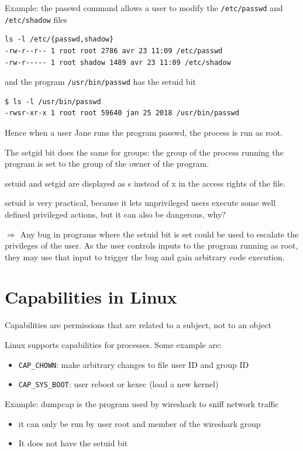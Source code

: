 \documentclass[11pt]{article}
\begin{document}
Example: the passwd command allows a user to modify the \verb|/etc/passwd| and \verb|/etc/shadow| files

\begin{lstlisting}[style=terminal]
ls -l /etc/{passwd,shadow}
-rw-r--r-- 1 root root 2786 avr 23 11:09 /etc/passwd
-rw-r----- 1 root shadow 1489 avr 23 11:09 /etc/shadow
\end{lstlisting}

and the program \verb|/usr/bin/passwd| has the setuid bit
\begin{lstlisting}[style=terminal]
$ ls -l /usr/bin/passwd
-rwsr-xr-x 1 root root 59640 jan 25 2018 /usr/bin/passwd
\end{lstlisting}

Hence when a user Jane runs the program passwd, the process is run as root. 

The setgid bit does the same for groups: the group of the process running the program is set to the group of the owner of the program. 

setuid and setgid are displayed as s instead of x in the access rights of the file.

setuid is very practical, because it lets unprivileged users execute some well defined privileged actions, but it can also be dangerous, why?

$\Rightarrow$ Any bug in programs where the setuid bit is set could be used to escalate the privileges of the user. As the user controls inputs to the program running as root, they may use that input to trigger the bug and gain arbitrary code execution.

\section*{Capabilities in Linux}

Capabilities are permissions that are related to a subject, not to an object

Linux supports capabilities for processes. Some example are: 
\begin{itemize}
	\item \verb|CAP_CHOWN|: make arbitrary changes to file user ID and group ID
	\item \verb|CAP_SYS_BOOT|: user reboot or kexec (load a new kernel)
\end{itemize}


Example: dumpcap is the program used by wireshark to sniff network traffic
\begin{itemize}
	\item it can only be run by user root and member of the wireshark group
	\item It does not have the setuid bit
\end{itemize}
\end{document}
